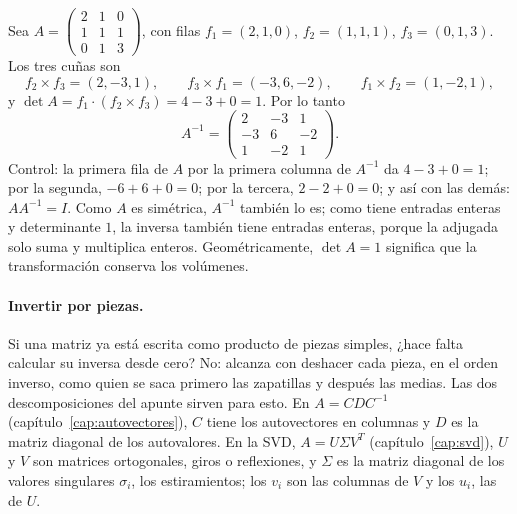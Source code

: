 \begin{ejemplo}\label{ej:inversa-cuna}
Sea \(A=\begin{pmatrix}2&1&0\\1&1&1\\0&1&3\end{pmatrix}\), con filas \(f_1=(2,1,0)\),
\(f_2=(1,1,1)\), \(f_3=(0,1,3)\). Los tres cuñas son
\[
  f_2\times f_3=(2,-3,1),\qquad f_3\times f_1=(-3,6,-2),\qquad f_1\times f_2=(1,-2,1),
\]
y \(\det A=f_1\cdot(f_2\times f_3)=4-3+0=1\). Por lo tanto
\[
  A^{-1}=\begin{pmatrix}2&-3&1\\-3&6&-2\\1&-2&1\end{pmatrix}.
\]
Control: la primera fila de \(A\) por la primera columna de \(A^{-1}\) da \(4-3+0=1\); por
la segunda, \(-6+6+0=0\); por la tercera, \(2-2+0=0\); y así con las demás: \(AA^{-1}=I\).
Como \(A\) es simétrica, \(A^{-1}\) también lo es; como tiene entradas enteras y
determinante \(1\), la inversa también tiene entradas enteras, porque la adjugada solo suma y
multiplica enteros. Geométricamente, \(\det A=1\) significa que la transformación
conserva los volúmenes.
\end{ejemplo}

\paragraph{Invertir por piezas.} Si una matriz ya está escrita como producto de piezas
simples, ¿hace falta calcular su inversa desde cero? No: alcanza con deshacer cada pieza, en el
orden inverso, como quien se saca primero las zapatillas y después las medias. Las dos
descomposiciones del apunte sirven para esto. En \(A=CDC^{-1}\)
(capítulo~\ref{cap:autovectores}), \(C\) tiene los autovectores en columnas y \(D\) es la
matriz diagonal de los autovalores. En la SVD, \(A=U\Sigma V^T\) (capítulo~\ref{cap:svd}),
\(U\) y \(V\) son matrices ortogonales, giros o reflexiones, y \(\Sigma\) es la matriz diagonal
de los valores singulares \(\sigma_i\), los estiramientos; los \(v_i\) son las columnas de
\(V\) y los \(u_i\), las de \(U\).

